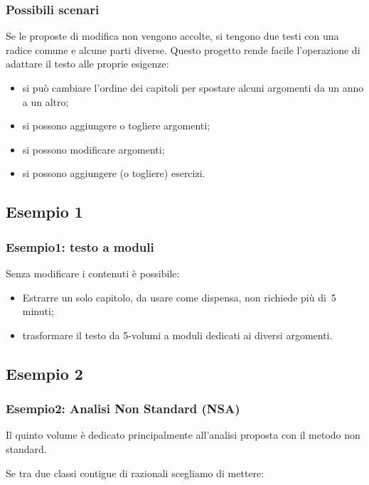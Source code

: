 \documentclass{beamer} %
\begin{document}
\begin{frame}\frametitle{Possibili scenari}

Se le proposte di modifica non vengono accolte, si tengono due testi con una 
radice comune e alcune parti diverse.
\spause
Questo progetto rende facile l'operazione di adattare il testo alle proprie 
esigenze:
\begin{itemize} %
\item si può cambiare l'ordine dei capitoli per spostare alcuni argomenti da 
un anno a un altro;
\item si possono aggiungere o togliere argomenti;
\item si possono modificare argomenti;
\item si possono aggiungere (o togliere) esercizi.
\end{itemize}

\end{frame}


\subsection{Esempio 1}


\begin{frame}\frametitle{Esempio1: testo a moduli}

Senza modificare i contenuti è possibile:
\begin{itemize} 
\item Estrarre un solo capitolo, da usare come dispensa, 
non richiede più di~5 minuti;
\item trasformare il testo da 5-volumi a moduli dedicati ai diversi argomenti.
\end{itemize}

\end{frame}


\subsection{Esempio 2}


\begin{frame}\frametitle{Esempio2: Analisi Non Standard (NSA)}

Il quinto volume è dedicato principalmente all'analisi 
proposta con il metodo non standard.

\pause
Se tra due classi contigue di razionali scegliamo di mettere:

\spause
{}



\end{frame}
\end{document}
